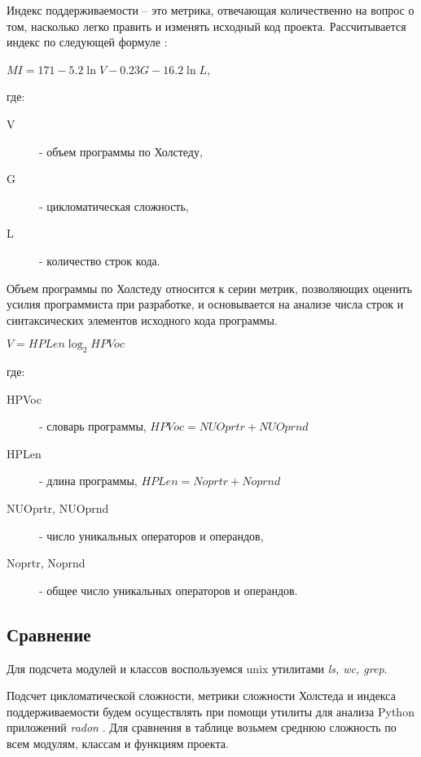     Индекс поддерживаемости -- это метрика, отвечающая количественно на вопрос
    о том, насколько легко править и изменять исходный код проекта.
    Рассчитывается индекс по следующей формуле \cite{metrics.cmcons}:
    \begin{center}
        $ MI = 171 - 5.2 \ln V - 0.23G - 16.2 \ln L $,
    \end{center}
    где:
    \begin{description}
        \item [V] - объем программы по Холстеду,
        \item [G] - цикломатическая сложность,
        \item [L] - количество строк кода.
    \end{description}

    Объем программы по Холстеду относится к серии метрик, позволяющих оценить
    усилия программиста при разработке, и основывается на анализе числа строк
    и синтаксических элементов исходного кода программы.
    \begin{center}
        $ V = HPLen \log_{2}HPVoc $
    \end{center}
    где:
    \begin{description}
        \item [HPVoc] - словарь программы,
        $ HPVoc = NUOprtr + NUOprnd $
        \item [HPLen] - длина программы,
        $ HPLen = Noprtr + Noprnd $
        \item [NUOprtr, NUOprnd] - число уникальных операторов и операндов,
        \item [Noprtr, Noprnd] - общее число уникальных операторов и операндов.
    \end{description}

    \subsection{Сравнение}
    Для подсчета модулей и классов воспользуемся unix утилитами \textit{ls, wc, grep}.

    Подсчет цикломатической сложности, метрики сложности Холстеда и индекса
    поддерживаемости будем осуществлять при помощи утилиты для
    анализа Python приложений \textit{radon} \cite{complexity.radon}.
    Для сравнения в таблице возьмем среднюю сложность по всем модулям, классам
    и функциям проекта.
    
